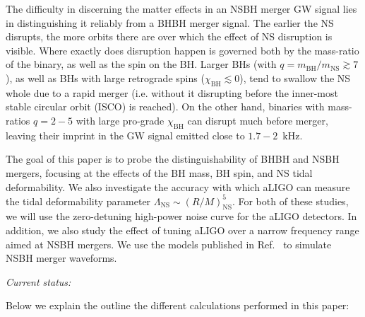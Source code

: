 \documentclass[aps,prd,amsmath,floats,floatfix, twocolumn,
superscriptaddress,nofootinbib,showpacs]{revtex4-1}
\newcommand{\prayush}{\textcolor{red!40!black}}
\newcommand{\NS}{\mathrm{NS}}
\begin{document}
The difficulty in discerning the matter effects in an NSBH merger GW signal
lies in distinguishing it reliably from a BHBH merger signal. The earlier the
NS disrupts, the more orbits there are over which the effect of NS disruption
is visible. Where exactly does disruption happen is governed both by the 
mass-ratio of the binary, as well as the spin on the BH. Larger BHs (with
$q=m_\mathrm{BH}/m_\mathrm{NS}\gtrsim 7$), as well as BHs with large retrograde
spins ($\chi_\mathrm{BH} \lesssim 0$), tend to swallow the NS whole due to a
rapid merger (i.e. without it disrupting before the inner-most stable circular
orbit (ISCO) is reached). On the other hand, binaries with mass-ratios 
$q=2-5$ with large pro-grade $\chi_\mathrm{BH}$ can disrupt much before 
merger, leaving their imprint in the GW signal emitted close to $1.7-2$~kHz.
% 

The goal of this paper is to probe the distinguishability of BHBH and NSBH
mergers, focusing at the effects of the BH mass, BH spin, and NS tidal 
deformability. We also investigate the accuracy with which aLIGO can measure
the tidal deformability parameter $\Lambda_\NS\sim(R/M)^5_\NS$. For both of 
these studies, we will use the zero-detuning high-power noise curve for the
aLIGO detectors. \prayush{In addition, we also study the effect of tuning aLIGO
over a narrow frequency range aimed at NSBH mergers.}
We use the models published in Ref.~\cite{Lackey:2013axa,Pannarale:2015jka} to
simulate NSBH merger waveforms.



\vspace{2cm}

\textit{\prayush{Current status:}}

Below we explain the outline the different calculations performed in this 
paper:
\end{document}
